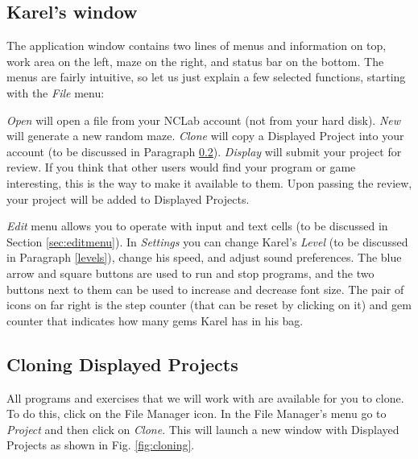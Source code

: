 \documentclass[article,A4,12pt]{llncs}
\begin{document}
\subsection{Karel's window} \label{menu}

The application window contains two lines of menus and information on top,
work area on the left, maze on the right, and status bar on the bottom.
The menus are fairly intuitive, so let us just explain a few selected functions, starting 
with the {\em File} menu:

{\em Open} will open a file from your NCLab account (not from your hard disk). {\em New} will generate a new random maze.
{\em Clone} will copy a Displayed Project into your account (to be discussed in Paragraph \ref{cloning}). 
{\em Display} will submit your project for review. If you think that 
      other users would find your program or game interesting, this is the way to make it 
      available to them. Upon passing the review, your project will be added to Displayed Projects.

{\em Edit} menu allows you to operate with input and text cells (to be discussed in 
Section \ref{sec:editmenu}). In {\em Settings} you can change Karel's {\em Level} (to be discussed
in Paragraph \ref{levels}), change his speed, and adjust sound preferences. The blue arrow and square 
buttons are used to run and stop programs, and the two buttons next to them can be used to increase and decrease 
font size. The pair of icons on far right is the step counter (that can be reset by clicking on it) and 
gem counter that indicates how many gems Karel has in his bag.

\subsection{Cloning Displayed Projects} \label{cloning}

All programs and exercises that we will work with are
available for you to clone. To do this, 
click on the File Manager icon. In the File Manager's menu go to 
{\em Project} and then click on {\em Clone}. This will launch a new window 
with Displayed Projects as shown in Fig. \ref{fig:cloning}.
\end{document}
